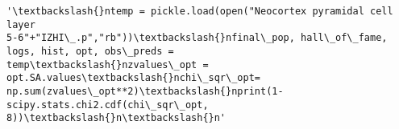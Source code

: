             \begin{tcolorbox}[breakable, size=fbox, boxrule=.5pt, pad at break*=1mm, opacityfill=0]
\begin{Verbatim}[commandchars=\\\{\}]
'\textbackslash{}ntemp = pickle.load(open("Neocortex pyramidal cell layer
5-6"+"IZHI\_.p","rb"))\textbackslash{}nfinal\_pop, hall\_of\_fame, logs, hist, opt, obs\_preds =
temp\textbackslash{}nzvalues\_opt = opt.SA.values\textbackslash{}nchi\_sqr\_opt=
np.sum(zvalues\_opt**2)\textbackslash{}nprint(1-scipy.stats.chi2.cdf(chi\_sqr\_opt, 8))\textbackslash{}n\textbackslash{}n'
\end{Verbatim}
\end{tcolorbox}
        




    

